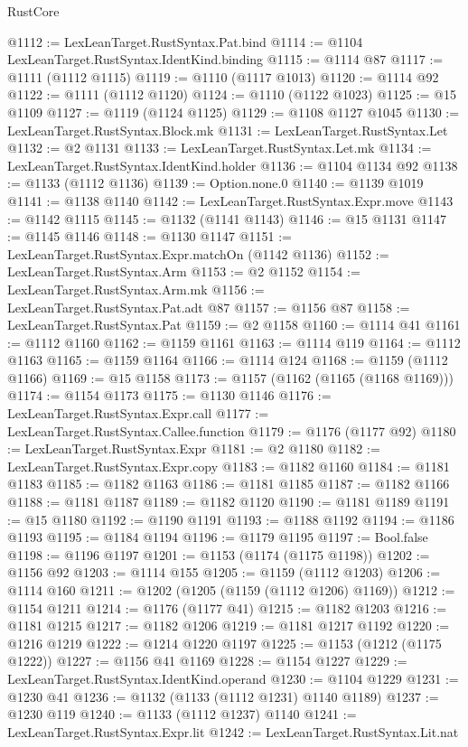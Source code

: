 \begin{lexlean}{RustCore}
\begin{coremodule}
@1112 := LexLeanTarget.RustSyntax.Pat.bind
@1114 := @1104 LexLeanTarget.RustSyntax.IdentKind.binding
@1115 := @1114 @87
@1117 := @1111 (@1112 @1115)
@1119 := @1110 (@1117 @1013)
@1120 := @1114 @92
@1122 := @1111 (@1112 @1120)
@1124 := @1110 (@1122 @1023)
@1125 := @15 @1109
@1127 := @1119 (@1124 @1125)
@1129 := @1108 @1127 @1045
@1130 := LexLeanTarget.RustSyntax.Block.mk
@1131 := LexLeanTarget.RustSyntax.Let
@1132 := @2 @1131
@1133 := LexLeanTarget.RustSyntax.Let.mk
@1134 := LexLeanTarget.RustSyntax.IdentKind.holder
@1136 := @1104 @1134 @92
@1138 := @1133 (@1112 @1136)
@1139 := Option.none.{0}
@1140 := @1139 @1019
@1141 := @1138 @1140
@1142 := LexLeanTarget.RustSyntax.Expr.move
@1143 := @1142 @1115
@1145 := @1132 (@1141 @1143)
@1146 := @15 @1131
@1147 := @1145 @1146
@1148 := @1130 @1147
@1151 := LexLeanTarget.RustSyntax.Expr.matchOn (@1142 @1136)
@1152 := LexLeanTarget.RustSyntax.Arm
@1153 := @2 @1152
@1154 := LexLeanTarget.RustSyntax.Arm.mk
@1156 := LexLeanTarget.RustSyntax.Pat.adt @87
@1157 := @1156 @87
@1158 := LexLeanTarget.RustSyntax.Pat
@1159 := @2 @1158
@1160 := @1114 @41
@1161 := @1112 @1160
@1162 := @1159 @1161
@1163 := @1114 @119
@1164 := @1112 @1163
@1165 := @1159 @1164
@1166 := @1114 @124
@1168 := @1159 (@1112 @1166)
@1169 := @15 @1158
@1173 := @1157 (@1162 (@1165 (@1168 @1169)))
@1174 := @1154 @1173
@1175 := @1130 @1146
@1176 := LexLeanTarget.RustSyntax.Expr.call
@1177 := LexLeanTarget.RustSyntax.Callee.function
@1179 := @1176 (@1177 @92)
@1180 := LexLeanTarget.RustSyntax.Expr
@1181 := @2 @1180
@1182 := LexLeanTarget.RustSyntax.Expr.copy
@1183 := @1182 @1160
@1184 := @1181 @1183
@1185 := @1182 @1163
@1186 := @1181 @1185
@1187 := @1182 @1166
@1188 := @1181 @1187
@1189 := @1182 @1120
@1190 := @1181 @1189
@1191 := @15 @1180
@1192 := @1190 @1191
@1193 := @1188 @1192
@1194 := @1186 @1193
@1195 := @1184 @1194
@1196 := @1179 @1195
@1197 := Bool.false
@1198 := @1196 @1197
@1201 := @1153 (@1174 (@1175 @1198))
@1202 := @1156 @92
@1203 := @1114 @155
@1205 := @1159 (@1112 @1203)
@1206 := @1114 @160
@1211 := @1202 (@1205 (@1159 (@1112 @1206) @1169))
@1212 := @1154 @1211
@1214 := @1176 (@1177 @41)
@1215 := @1182 @1203
@1216 := @1181 @1215
@1217 := @1182 @1206
@1219 := @1181 @1217 @1192
@1220 := @1216 @1219
@1222 := @1214 @1220 @1197
@1225 := @1153 (@1212 (@1175 @1222))
@1227 := @1156 @41 @1169
@1228 := @1154 @1227
@1229 := LexLeanTarget.RustSyntax.IdentKind.operand
@1230 := @1104 @1229
@1231 := @1230 @41
@1236 := @1132 (@1133 (@1112 @1231) @1140 @1189)
@1237 := @1230 @119
@1240 := @1133 (@1112 @1237) @1140
@1241 := LexLeanTarget.RustSyntax.Expr.lit
@1242 := LexLeanTarget.RustSyntax.Lit.nat

\end{coremodule}
\end{lexlean}
